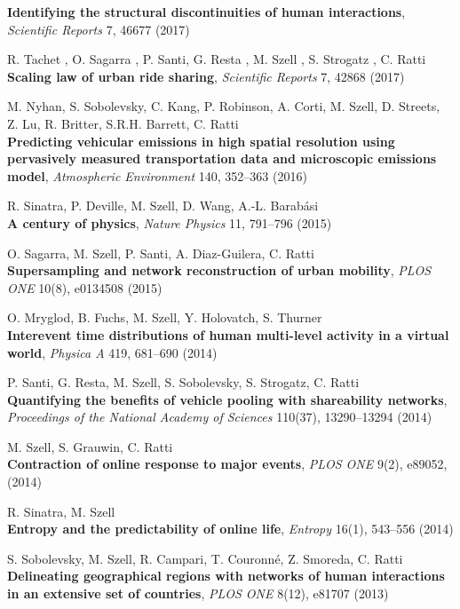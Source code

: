 \documentclass[10pt,a4paper]{article}
\renewenvironment{itemize}{
  \begin{list}{}{
    \setlength{\leftmargin}{1.5em}
    \setlength{\itemsep}{0.25em}
    \setlength{\parskip}{0pt}
    \setlength{\parsep}{0.25em}
  }
}{
  \end{list}
}
\begin{document}
\begin{itemize}
    \textbf{Identifying the structural discontinuities of human interactions}, \textit{Scientific Reports} 7, 46677 (2017)
\item R. Tachet , O. Sagarra , P. Santi, G. Resta , M. Szell , S. Strogatz , C. Ratti\\
    \textbf{Scaling law of urban ride sharing}, \textit{Scientific Reports} 7, 42868 (2017)
\item M. Nyhan, S. Sobolevsky, C. Kang, P. Robinson, A. Corti, M. Szell, D. Streets, Z. Lu, R. Britter, S.R.H. Barrett, C. Ratti\\
    \textbf{Predicting vehicular emissions in high spatial resolution using pervasively measured transportation data and microscopic emissions model}, \textit{Atmospheric Environment} 140, 352--363 (2016)
\item R. Sinatra, P. Deville, M. Szell, D. Wang, A.-L. Barab\'asi\\
    \textbf{A century of physics}, \textit{Nature Physics} 11, 791--796 (2015)
\item O. Sagarra, M. Szell, P. Santi, A. Diaz-Guilera, C. Ratti\\
    \textbf{Supersampling and network reconstruction of urban mobility}, \textit{PLOS ONE} 10(8), e0134508 (2015)
\item O. Mryglod, B. Fuchs, M. Szell, Y. Holovatch, S. Thurner\\
    \textbf{Interevent time distributions of human multi-level activity in a virtual world}, \textit{Physica A} 419, 681--690 (2014)
\item P. Santi, G. Resta, M. Szell, S. Sobolevsky, S. Strogatz, C. Ratti\\
    \textbf{Quantifying the benefits of vehicle pooling with shareability networks},  \textit{Proceedings of the National Academy of Sciences} 110(37), 13290--13294 (2014)
\item M. Szell, S. Grauwin, C. Ratti\\
    \textbf{Contraction of online response to major events}, \textit{PLOS ONE} 9(2), e89052, (2014)
\item R. Sinatra, M. Szell\\
    \textbf{Entropy and the predictability of online life}, \textit{Entropy} 16(1), 543--556 (2014)
\item S. Sobolevsky, M. Szell, R. Campari, T. Couronn\'e, Z. Smoreda, C. Ratti\\
    \textbf{Delineating geographical regions with networks of human interactions in an extensive set of countries}, \textit{PLOS ONE} 8(12), e81707 (2013)

\end{itemize}
\end{document}

